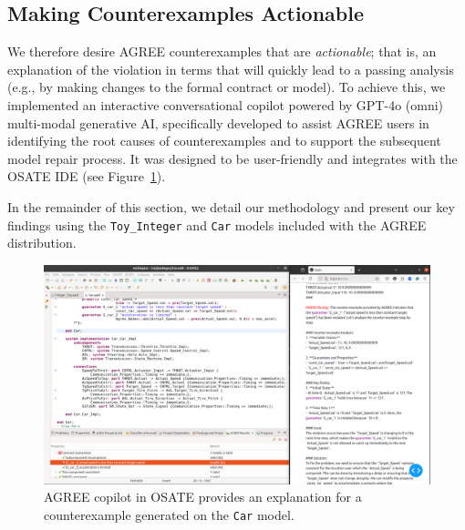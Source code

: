 \subsection{Making Counterexamples Actionable} 
We therefore desire AGREE counterexamples that are \textit{actionable}; that is, an explanation of the violation in terms that will quickly lead to a passing analysis (e.g., by making changes to the formal contract or model).
%
To achieve this, we implemented
an interactive conversational copilot powered by GPT-4o (omni) multi-modal generative AI, specifically developed to assist AGREE users in identifying the root causes of counterexamples and to support the subsequent model repair process. It was designed to be user-friendly and integrates with the OSATE IDE (see Figure~\ref{fig:AGREEDOG}). 

In the remainder of this section, we detail our methodology and present our key findings using the \texttt{Toy\_Integer} and \texttt{Car} models included with the AGREE distribution.

\begin{figure}[htbp]  
    \centering
    \includegraphics[width=\textwidth]{AGREE-DOG-high-rs.png}%
    \caption{AGREE copilot in OSATE provides an explanation for a counterexample generated on the \texttt{Car} model.}
    \label{fig:AGREEDOG}
\end{figure}


